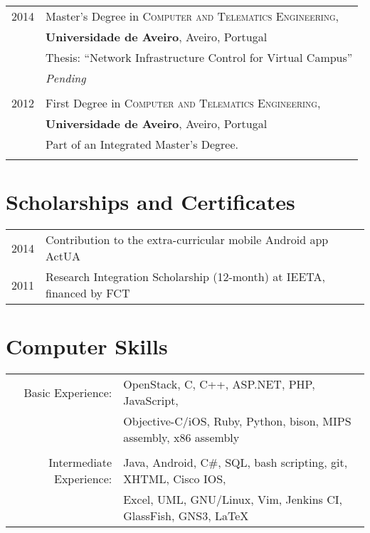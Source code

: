 \documentclass[a4paper,10pt]{article} %
\begin{document}
\begin{tabular}{rl}	
\textsc{2014} & Master's Degree in \textsc{Computer and Telematics Engineering}, \\
&\textbf{Universidade de Aveiro}, Aveiro, Portugal\\
& Thesis: ``Network Infrastructure Control for Virtual Campus''\\
& \textit{Pending}\\
&\\


\textsc{2012} & First Degree in \textsc{Computer and Telematics Engineering}, \\
&\textbf{Universidade de Aveiro}, Aveiro, Portugal\\
& Part of an Integrated Master's Degree. 	\\
&\\


\end{tabular}


\section{Scholarships and Certificates}

\begin{tabular}{rl}
\textsc{2014} & Contribution to the extra-curricular mobile Android app ActUA \normalsize\\
\textsc{2011} & Research Integration Scholarship (12-month) at IEETA, financed by FCT \normalsize\\
\end{tabular}


\section{Computer Skills}

\begin{tabular}{rl}
Basic Experience: & OpenStack, C, C++, ASP.NET, PHP, JavaScript,\\
& Objective-C/iOS, Ruby, Python, bison, MIPS assembly, x86 assembly\\
& \\

Intermediate Experience: & Java, Android, C\#, SQL, bash scripting, git, XHTML, Cisco IOS,\\
& Excel, UML, GNU/Linux, Vim, Jenkins CI, GlassFish, GNS3, {\LaTeX}\\
\end{tabular}
\end{document}
